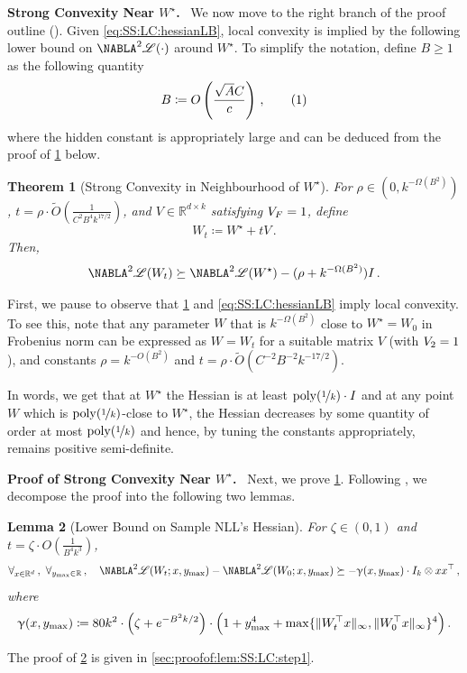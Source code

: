 \documentclass[11pt,letterpaper]{article}
\theoremstyle{plain}
\newtheorem{theorem}{Theorem}[section]
\newtheorem{lemma}[theorem]{Lemma}
\theoremstyle{definition}
\theoremstyle{remark}
\newcommand{\yesnum}{\addtocounter{equation}{1}\tag{\theequation}}
\newcommand{\sinbrace}[1]{\ensuremath{\{#1\}}}
\newcommand{\inparen}[1]{\ensuremath{\left(#1\right)}}
\let\norm\relax
\newcommand{\norm}[1]{\ensuremath{\left\lVert #1 \right\rVert}}
\newcommand{\R}{\mathbb{R}}
\newcommand{\nfrac}[2]{\nicefrac{#1}{#2}}
\newcommand{\poly}{\mathrm{poly}}
\newcommand*{\Nabla}{\boldsymbol\NABLA}
\let\nabla\Nabla
\newcommand{\wt}[1]{\widetilde{#1}}
\newcommand{\customcal}[1]{\euscr{#1}}
\newcommand{\cL}{\customcal{L}}
\renewcommand{\paragraph}[1]{\medskip \noindent\textbf{#1}~}
\renewcommand{\gamma}{\upgamma}
\newcommand{\negLL}{\ensuremath{\mathscr{L}}}
\newcommand{\Wstar}{{W^\star}}
\newcommand{\ymax}{y_{\max}}
\renewcommand{\cL}{\negLL}
\begin{document}
{{    \paragraph{Strong Convexity Near $W^\star$.}
    We now move to the right branch of the proof outline ().
    Given \cref{eq:SS:LC:hessianLB}, local convexity is implied by the following lower bound on $\nabla^2 \negLL(\cdot)$ around $\Wstar$.
    To simplify the notation,
    define $B\geq 1$ as the following quantity 
    \[
        B\coloneqq O\inparen{\frac{\sqrt{A}C}{c}}\,,
        \yesnum\label{eq:SS:LC:defB}
    \]
    where the hidden constant is appropriately large and can be deduced from the proof of \cref{thm:SS:LC:formal} below.
    \begin{theorem}[Strong Convexity in Neighbourhood of $W^\star$]\label{thm:SS:LC:formal}
    For $\rho\in(0,k^{-\Omega(B^2)})$, $t=\rho\cdot \wt{O}\inparen{\frac{1}{C^2B^4k^{17/2}}}$, and $V\in\R^{d\times k}$ satisfying $\norm{V}_F=1$, 
    define
    \[
        W_t\coloneqq W^\star+tV\,.
    \]
    Then, 
    \[
        \nabla^2 \cL(W_t) 
        \succeq 
        \nabla^2 \cL(W^\star)
            - (\rho + k^{-\Omega(B^2)}) I\,.
    \] 
    \end{theorem}
    First, we pause to observe that \cref{thm:SS:LC:formal} and \cref{eq:SS:LC:hessianLB} imply local convexity.
    To see this, note that any parameter $W$ that is $k^{-\Omega(B^2)}$ close to $W^\star=W_0$ in Frobenius norm can be expressed as $W=W_t$ for a suitable matrix $V$ (with $\norm{V}_2=1$), and constants $\rho=k^{-O(B^2)}$ and $t=\rho\cdot \wt{O}\inparen{{C^{-2}B^{-2}k^{-17/2}}}$. 
    

    In words, we get that at $W^\star$ the Hessian is at least $\poly(\nfrac{1}{k}) \cdot I$ and at any point $W$ which is $\poly(\nfrac{1}{k})$-close to $W^\star$, the Hessian decreases by some quantity of order at most $\poly(\nfrac{1}{k})$ and hence, by tuning the constants appropriately, remains {positive semi-definite}.
    
\bigskip 

\paragraph{Proof of Strong Convexity Near $W^\star$.} Next, we prove \cref{thm:SS:LC:formal}. 
Following , we decompose the proof into the following two lemmas.

\begin{lemma}[Lower Bound on Sample NLL's Hessian]\label{lem:SS:LC:step1}
For $\zeta\in(0,1)$ and $t=\zeta\cdot O\inparen{\frac{1}{B^4k^3}}$, 
\[
    \forall_{x\in \R^d}\,,~\forall_{\ymax\in \R}\,,\quad 
    \nabla^2 \cL(W_t;x,\ymax) - \nabla^2 \cL(W_0;x,\ymax) \succeq -\gamma(x,\ymax) \cdot I_{k}\otimes xx^\top\,,
\]
where
\[ 
    \gamma(x,\ymax) \coloneqq 
        80 k^2\cdot
        \Bigl(\zeta + e^{-B^2 k/2}\Bigr)\cdot
        \Bigl(1 + \ymax^4 + \max\sinbrace{\|W_t^\top x\|_\infty, \|W_0^\top x\|_\infty}^4\Bigr)
        \,.
\]
\end{lemma}
The proof of \cref{lem:SS:LC:step1} is given in \cref{sec:proofof:lem:SS:LC:step1}.

}}
\end{document}
